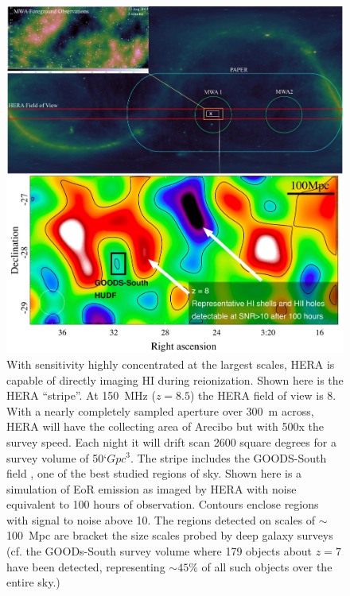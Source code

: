 \documentclass[preprint]{aastex}
\begin{document}

\begin{figure}[!ht]\centering
\includegraphics[width=\textwidth]{plots/Imaging/HERA_FoV_and_sim.jpg}%
\caption{\small
With sensitivity highly concentrated at the largest scales, HERA is capable of directly imaging HI during reionization.  Shown here is the HERA ``stripe''.  At 150~MHz ($z=8.5$) the HERA field of view is 8\arcdeg.  With a nearly completely sampled aperture over 300~m across, HERA will have the collecting area of Arecibo but with 500x the survey speed. Each night it will drift scan 2600 square degrees for a survey volume of 50`$Gpc^3$.  The stripe includes the GOODS-South field \citep{dickinson_et_al2003}, one of the best studied regions of sky.  Shown here is a simulation of EoR emission \citep{mcquinn_et_al2007} as imaged by HERA with noise equivalent to 100 hours of observation.  
Contours enclose regions with signal to noise above 10.  The regions detected on scales of $\sim$100~Mpc are bracket the size scales probed by deep galaxy surveys (cf. the GOODs-South survey volume where 179 objects about $z=7$ have been detected, representing $\sim45\%$ of all such objects over the entire sky.)}  \label{fig:imaging}
\end{figure}    
\end{document}
